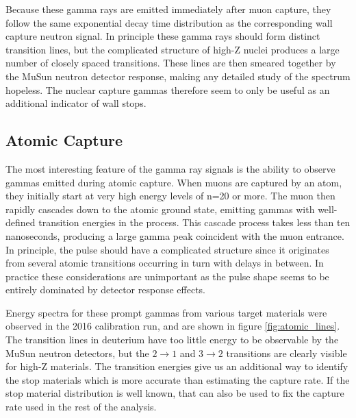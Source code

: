 Because these gamma rays are emitted immediately after muon capture, they follow the same exponential decay time distribution as the corresponding wall capture neutron signal.  
In principle these gamma rays should form distinct transition lines, but the complicated structure of high-Z nuclei produces a large number of closely spaced transitions.
These lines are then smeared together by the MuSun neutron detector response, making any detailed study of the spectrum hopeless.
The nuclear capture gammas therefore seem to only be useful as an additional indicator of wall stops.

\subsection{Atomic Capture}

The most interesting feature of the gamma ray signals is the ability to observe gammas emitted during atomic capture. 
When muons are captured by an atom, they initially start at very high energy levels of n=20 or more.  %
The muon then rapidly cascades down to the atomic ground state, emitting gammas with well-defined transition energies in the process.
This cascade process takes less than ten nanoseconds, producing a large gamma peak coincident with the muon entrance.
In principle, the pulse should have a complicated structure since it originates from several atomic transitions occurring in turn with delays in between.
In practice these considerations are unimportant as the pulse shape seems to be entirely dominated by detector response effects.

Energy spectra for these prompt gammas from various target materials were observed in the 2016 calibration run, and are shown in figure \ref{fig:atomic_lines}. 
The transition lines in deuterium have too little energy to be observable by the MuSun neutron detectors, but the $2 \rightarrow 1$ and $3 \rightarrow 2$ transitions are clearly visible for high-Z materials.
The transition energies give us an additional way to identify the stop materials which is more accurate than estimating the capture rate.
If the stop material distribution is well known, that can also be used to fix the capture rate used in the rest of the analysis.

